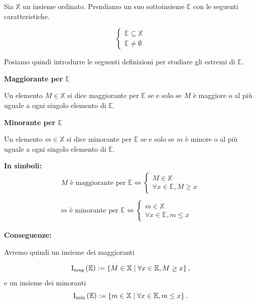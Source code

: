Sia $\mathbb{X}$ un insieme ordinato. Prendiamo un suo sottoinsieme $\mathbb{E}$ con le seguenti
caratteristiche.

\[
    \begin{cases}
        \mathbb{E} \subseteq \mathbb{X} \\
        \mathbb{E} \neq \emptyset
    \end{cases}
\]

Posiamo quindi introdurre le seguenti definizioni per studiare gli estremi di $\mathbb{E}$.

\begin{definition}
    \textbf{Maggiorante per $\mathbb{E}$}

    Un elemento $M \in \mathbb{X}$ si dice maggiorante per $\mathbb{E}$ se e solo se $M$ è
    maggiore o al più uguale a ogni singolo elemento di $\mathbb{E}$.
\end{definition}


\begin{definition}
    \textbf{Minorante per $\mathbb{E}$}

    Un elemento $m \in \mathbb{X}$ si dice minorante per $\mathbb{E}$ se e solo se $m$ è
    minore o al più uguale a ogni singolo elemento di $\mathbb{E}$.
\end{definition}

\noindent\textbf{In simboli:}
\[
    \begin{aligned}
        M \text{ è maggiorante per } \mathbb{E} \Leftrightarrow
        \begin{cases}
            M \in \mathbb{X} \\
            \forall x \in \mathbb{E}, M \geq x
        \end{cases}
    \\ \\
        m \text{ è minorante per } \mathbb{E} \Leftrightarrow
        \begin{cases}
            m \in \mathbb{X} \\
            \forall x \in \mathbb{E}, m \leq x
        \end{cases}
    \end{aligned}
\]


\noindent\textbf{Conseguenze:}

Avremo quindi un insieme dei maggioranti

\[
    \operatorname{I_{mag}\left(\mathbb{E}\right)} := \left\{M\in\mathbb{X}\mid\forall x\in\mathbb{E}, M \geq x\right\},
\]
e un insieme dei minoranti
\[
    \operatorname{I_{min}\left(\mathbb{E}\right)} := \left\{m\in\mathbb{X}\mid\forall x\in\mathbb{E}, m \leq x\right\}.
\]

